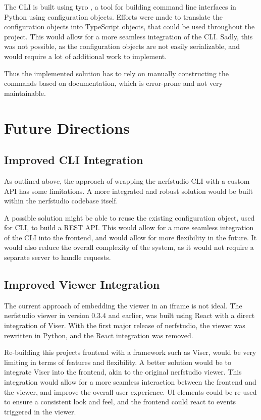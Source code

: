 The CLI is built using tyro \cite{yi_brentyityro_2024}, a tool for building command line interfaces in Python using configuration objects.
Efforts were made to translate the configuration objects into TypeScript objects, that could be used throughout the project.
This would allow for a more seamless integration of the CLI.
Sadly, this was not possible, as the configuration objects are not easily serializable, and would require a lot of additional work to implement.

Thus the implemented solution has to rely on manually constructing the commands based on documentation, which is error-prone and not very maintainable.

\section{Future Directions}
\label{sec:system:future}

\subsection*{Improved CLI Integration}

As outlined above, the approach of wrapping the nerfstudio CLI with a custom API has some limitations.
A more integrated and robust solution would be built within the nerfstudio codebase itself.

A possible solution might be able to reuse the existing configuration object, used for CLI, to build a REST API.
This would allow for a more seamless integration of the CLI into the frontend, and would allow for more flexibility in the future.
It would also reduce the overall complexity of the system, as it would not require a separate server to handle requests.

\subsection*{Improved Viewer Integration}

The current approach of embedding the viewer in an iframe is not ideal.
The nerfstudio viewer in version 0.3.4 and earlier, was built using React with a direct integration of Viser.
With the first major release of nerfstudio, the viewer was rewritten in Python, and the React integration was removed.

Re-building this projects frontend with a framework such as Viser, would be very limiting in terms of features and flexibility.
A better solution would be to integrate Viser into the frontend, akin to the original nerfstudio viewer.
This integration would allow for a more seamless interaction between the frontend and the viewer, and improve the overall user experience.
UI elements could be re-used to ensure a consistent look and feel, and the frontend could react to events triggered in the viewer.
